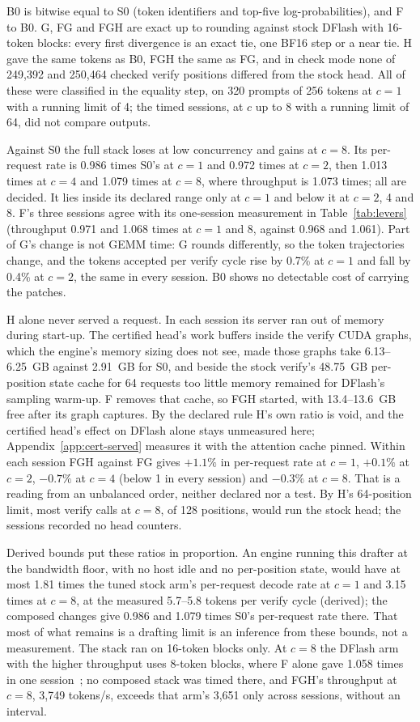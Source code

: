 B0 is bitwise equal to S0 (token identifiers and top-five log-probabilities), and F to B0. G, FG and FGH are exact up to rounding against stock DFlash with 16-token blocks: every first divergence is an exact tie, one BF16 step or a near tie. H gave the same tokens as B0, FGH the same as FG, and in check mode none of 249,392 and 250,464 checked verify positions differed from the stock head. All of these were classified in the equality step, on 320 prompts of 256 tokens at $c=1$ with a running limit of 4; the timed sessions, at $c$ up to 8 with a running limit of 64, did not compare outputs.

Against S0 the full stack loses at low concurrency and gains at $c=8$. Its per-request rate is 0.986 times S0's at $c=1$ and 0.972 times at $c=2$, then 1.013 times at $c=4$ and 1.079 times at $c=8$, where throughput is 1.073 times; all are decided. It lies inside its declared range only at $c=1$ and below it at $c=2$, 4 and 8. F's three sessions agree with its one-session measurement in Table~\ref{tab:levers} (throughput 0.971 and 1.068 times at $c=1$ and 8, against 0.968 and 1.061). Part of G's change is not GEMM time: G rounds differently, so the token trajectories change, and the tokens accepted per verify cycle rise by 0.7\% at $c=1$ and fall by 0.4\% at $c=2$, the same in every session. B0 shows no detectable cost of carrying the patches.

H alone never served a request. In each session its server ran out of memory during start-up. The certified head's work buffers inside the verify CUDA graphs, which the engine's memory sizing does not see, made those graphs take 6.13--6.25~GB against 2.91~GB for S0, and beside the stock verify's 48.75~GB per-position state cache for 64 requests too little memory remained for DFlash's sampling warm-up. F removes that cache, so FGH started, with 13.4--13.6~GB free after its graph captures. By the declared rule H's own ratio is void, and the certified head's effect on DFlash alone stays unmeasured here; Appendix~\ref{app:cert-served} measures it with the attention cache pinned. Within each session FGH against FG gives $+1.1\%$ in per-request rate at $c=1$, $+0.1\%$ at $c=2$, $-0.7\%$ at $c=4$ (below 1 in every session) and $-0.3\%$ at $c=8$. That is a reading from an unbalanced order, neither declared nor a test. By H's 64-position limit, most verify calls at $c=8$, of 128 positions, would run the stock head; the sessions recorded no head counters.

Derived bounds put these ratios in proportion. An engine running this drafter at the bandwidth floor, with no host idle and no per-position state, would have at most 1.81 times the tuned stock arm's per-request decode rate at $c=1$ and 3.15 times at $c=8$, at the measured 5.7--5.8 tokens per verify cycle (derived); the composed changes give 0.986 and 1.079 times S0's per-request rate there. That most of what remains is a drafting limit is an inference from these bounds, not a measurement. The stack ran on 16-token blocks only. At $c=8$ the DFlash arm with the higher throughput uses 8-token blocks, where F alone gave 1.058 times in one session~; no composed stack was timed there, and FGH's throughput at $c=8$, 3,749 tokens/s, exceeds that arm's 3,651 only across sessions, without an interval.

